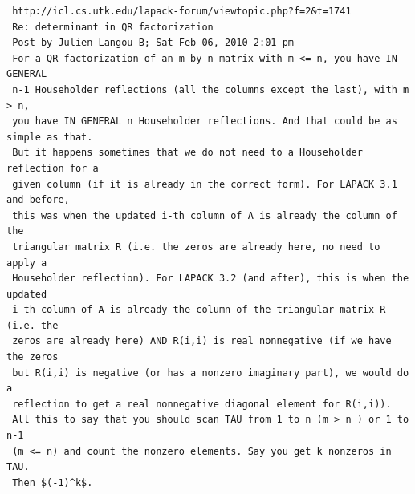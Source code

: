 \documentclass[11pt,openany,twoside]{book}
\numberwithin{equation}{section}		%
\begin{document}
\begin{lstlisting}
 http://icl.cs.utk.edu/lapack-forum/viewtopic.php?f=2&t=1741
 Re: determinant in QR factorization
 Post by Julien Langou B; Sat Feb 06, 2010 2:01 pm
 For a QR factorization of an m-by-n matrix with m <= n, you have IN GENERAL
 n-1 Householder reflections (all the columns except the last), with m > n,
 you have IN GENERAL n Householder reflections. And that could be as simple as that.
 But it happens sometimes that we do not need to a Householder reflection for a
 given column (if it is already in the correct form). For LAPACK 3.1 and before,
 this was when the updated i-th column of A is already the column of the
 triangular matrix R (i.e. the zeros are already here, no need to apply a
 Householder reflection). For LAPACK 3.2 (and after), this is when the updated
 i-th column of A is already the column of the triangular matrix R (i.e. the
 zeros are already here) AND R(i,i) is real nonnegative (if we have the zeros
 but R(i,i) is negative (or has a nonzero imaginary part), we would do a
 reflection to get a real nonnegative diagonal element for R(i,i)).
 All this to say that you should scan TAU from 1 to n (m > n ) or 1 to n-1
 (m <= n) and count the nonzero elements. Say you get k nonzeros in TAU.
 Then $(-1)^k$.
\end{lstlisting}
\end{document}
